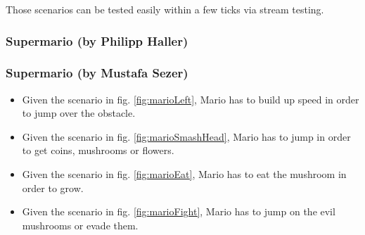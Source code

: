 Those scenarios can be tested easily within a few ticks via stream testing.

\subsubsection{Supermario (by Philipp Haller)}



\subsubsection{Supermario (by Mustafa Sezer)}
\begin{itemize}
	\item Given the scenario in fig. \ref{fig:marioLeft}, Mario has to build up speed in order to jump over the obstacle.
	\item Given the scenario in fig. \ref{fig:marioSmashHead}, Mario has to jump in order to get coins, mushrooms or flowers.
	\item Given the scenario in fig. \ref{fig:marioEat}, Mario has to eat the mushroom in order to grow.
	\item Given the scenario in fig. \ref{fig:marioFight}, Mario has to jump on the evil mushrooms or evade them.
\end{itemize}

